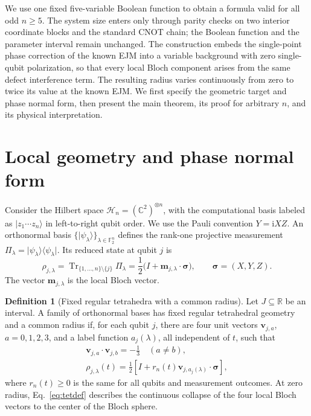 \documentclass[11pt,a4paper]{article}
\numberwithin{equation}{section}
\theoremstyle{definition}
\newtheorem{definition}[theorem]{Definition}
\newcommand{\F}{\mathbb F}
\newcommand{\C}{\mathbb C}
\newcommand{\R}{\mathbb R}
\newcommand{\ii}{\mathrm i}
\newcommand{\Tr}{\operatorname{Tr}}
\newcommand{\ket}[1]{\lvert#1\rangle}
\newcommand{\bra}[1]{\langle#1\rvert}
\begin{document}
We use one fixed five-variable Boolean function to obtain a formula valid for all odd $n\geq5$. The system size enters only through parity checks on two interior coordinate blocks and the standard CNOT chain; the Boolean function and the parameter interval remain unchanged. The construction embeds the single-point phase correction of the known EJM into a variable background with zero single-qubit polarization, so that every local Bloch component arises from the same defect interference term. The resulting radius varies continuously from zero to twice its value at the known EJM. We first specify the geometric target and phase normal form, then present the main theorem, its proof for arbitrary $n$, and its physical interpretation.

\section{Local geometry and phase normal form}
\label{sec:setup}

Consider the Hilbert space $\mathcal H_n=(\C^2)^{\otimes n}$, with the computational basis labeled as $\ket{z_1\cdots z_n}$ in left-to-right qubit order. We use the Pauli convention $Y=\ii XZ$. An orthonormal basis $\{\ket{\psi_\lambda}\}_{\lambda\in\F_2^n}$ defines the rank-one projective measurement $\Pi_\lambda=\ket{\psi_\lambda}\bra{\psi_\lambda}$. Its reduced state at qubit $j$ is
\begin{equation}
 \rho_{j,\lambda}=\Tr_{\{1,\ldots,n\}\setminus\{j\}}\Pi_\lambda
 =\frac12\bigl(I+\bm m_{j,\lambda}\cdot\bm\sigma\bigr),
 \qquad \bm\sigma=(X,Y,Z).
\end{equation}
The vector $\bm m_{j,\lambda}$ is the local Bloch vector.

\begin{definition}[Fixed regular tetrahedra with a common radius]
Let $J\subseteq\R$ be an interval. A family of orthonormal bases has fixed regular tetrahedral geometry and a common radius if, for each qubit $j$, there are four unit vectors $\bm v_{j,a}$, $a=0,1,2,3$, and a label function $a_j(\lambda)$, all independent of $t$, such that
\begin{equation}
 \begin{gathered}
 \bm v_{j,a}\cdot\bm v_{j,b}=-\frac13\quad(a\ne b),\\
 \rho_{j,\lambda}(t)=\frac12\left[I+r_n(t)\bm v_{j,a_j(\lambda)}\cdot\bm\sigma\right],
 \end{gathered}
 \label{eq:tetdef}
\end{equation}
where $r_n(t)\geq0$ is the same for all qubits and measurement outcomes. At zero radius, Eq.~\eqref{eq:tetdef} describes the continuous collapse of the four local Bloch vectors to the center of the Bloch sphere.
\end{definition}
\end{document}
